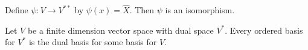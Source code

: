 \begin{theorem}
    Define $\psi : V \rightarrow V^{**}$ by $\psi (x) = \hat{X}$.  Then $\psi$ is an isomorphism.
\end{theorem}

\begin{theorem}
    Let $V$ be a finite dimension vector space with dual space $V^*$. Every ordered basis for $V^*$ is the dual basis for some basis for $V$.
\end{theorem}

\begin{center}
\end{center}





